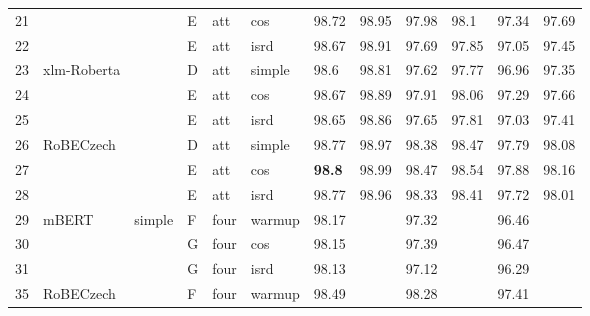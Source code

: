\begin{table}[!h]
{\begin{tabular}{|l|l|l|l|l|l||llllll|}
21 &                              &                         & E	& att              & cos    & 98.72  & 98.95   & 97.98   & 98.1     & 97.34     & 97.69      \\ \cline{1-1} \cline{4-12}
22 &                              &                         & E	& att              & isrd   & 98.67  & 98.91   & 97.69   & 97.85    & 97.05     & 97.45      \\ \cline{1-2} \cline{4-12}
23 & \multirow{3}{*}{xlm-Roberta} &                         & D	& att      & simple & 98.6   & 98.81   & 97.62   & 97.77    & 96.96     & 97.35      \\ \cline{1-1} \cline{4-12}
24 &                              &                         & E	& att              & cos    & 98.67  & 98.89   & 97.91   & 98.06    & 97.29     & 97.66      \\ \cline{1-1} \cline{4-12}
25 &                              &                         & E	& att              & isrd   & 98.65  & 98.86   & 97.65   & 97.81    & 97.03     & 97.41      \\ \cline{1-2} \cline{4-12}
26 & \multirow{3}{*}{RoBECzech}   &                         & D	& att      & simple & 98.77  & 98.97   & 98.38   & 98.47    & 97.79     & 98.08      \\ \cline{1-1} \cline{4-12}
27 &                              &                         & E	& att              & cos    & \textbf{98.8}   & 98.99   & 98.47   & 98.54    & 97.88     & 98.16      \\ \cline{1-1} \cline{4-12}
28 &                              &                         & E	& att              & isrd   & 98.77  & 98.96   & 98.33   & 98.41    & 97.72     & 98.01      \\ \hline
29 & \multirow{3}{*}{mBERT}       & \multirow{9}{*}{simple} & F	& four                     & warmup & 98.17  &         & 97.32   &          & 96.46     &            \\ \cline{1-1} \cline{4-12}
30 &                              &                         & G	& four                     & cos    & 98.15  &         & 97.39   &          & 96.47     &            \\ \cline{1-1} \cline{4-12}
31 &                              &                         & G	& four                     & isrd   & 98.13  &         & 97.12   &          & 96.29     &            \\ \cline{1-2} \cline{4-12}
35 & \multirow{3}{*}{RoBECzech}   &                         & F	& four                     & warmup & 98.49  &         & 98.28   &          & 97.41     &            \\ \cline{1-1} \cline{4-12}

\end{tabular}}
\end{table}
